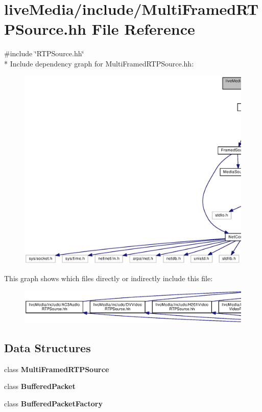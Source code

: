 \section{live\+Media/include/\+Multi\+Framed\+R\+T\+P\+Source.hh File Reference}
\label{MultiFramedRTPSource_8hh}
{\ttfamily \#include \char`\"{}R\+T\+P\+Source.\+hh\char`\"{}}\\*
Include dependency graph for Multi\+Framed\+R\+T\+P\+Source.\+hh\+:
\nopagebreak
\begin{figure}[H]
\begin{center}
\leavevmode
\includegraphics[width=350pt]{MultiFramedRTPSource_8hh__incl}
\end{center}
\end{figure}
This graph shows which files directly or indirectly include this file\+:
\nopagebreak
\begin{figure}[H]
\begin{center}
\leavevmode
\includegraphics[width=350pt]{MultiFramedRTPSource_8hh__dep__incl}
\end{center}
\end{figure}
\subsection*{Data Structures}
\begin{DoxyCompactItemize}
\item 
class {\bf Multi\+Framed\+R\+T\+P\+Source}
\item 
class {\bf Buffered\+Packet}
\item 
class {\bf Buffered\+Packet\+Factory}
\end{DoxyCompactItemize}
